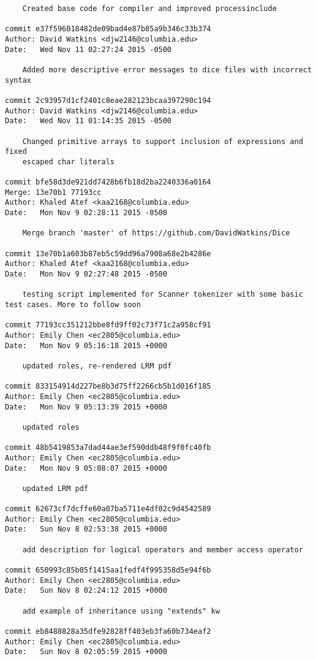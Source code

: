\begin{verbatim}
    Created base code for compiler and improved processinclude

commit e37f596018482de09bad4e87b85a9b346c33b374
Author: David Watkins <djw2146@columbia.edu>
Date:   Wed Nov 11 02:27:24 2015 -0500

    Added more descriptive error messages to dice files with incorrect syntax

commit 2c93957d1cf2401c8eae282123bcaa397290c194
Author: David Watkins <djw2146@columbia.edu>
Date:   Wed Nov 11 01:14:35 2015 -0500

    Changed primitive arrays to support inclusion of expressions and fixed
    escaped char literals

commit bfe58d3de921dd7428b6fb18d2ba2240336a0164
Merge: 13e70b1 77193cc
Author: Khaled Atef <kaa2168@columbia.edu>
Date:   Mon Nov 9 02:28:11 2015 -0500

    Merge branch 'master' of https://github.com/DavidWatkins/Dice

commit 13e70b1a603b87eb5c59dd96a7908a68e2b4286e
Author: Khaled Atef <kaa2168@columbia.edu>
Date:   Mon Nov 9 02:27:48 2015 -0500

    testing script implemented for Scanner tokenizer with some basic test cases. More to follow soon

commit 77193cc351212bbe8fd9ff02c73f71c2a958cf91
Author: Emily Chen <ec2805@columbia.edu>
Date:   Mon Nov 9 05:16:18 2015 +0000

    updated roles, re-rendered LRM pdf

commit 833154914d227be8b3d75ff2266cb5b1d016f185
Author: Emily Chen <ec2805@columbia.edu>
Date:   Mon Nov 9 05:13:39 2015 +0000

    updated roles

commit 48b5419853a7dad44ae3ef590ddb48f9f0fc40fb
Author: Emily Chen <ec2805@columbia.edu>
Date:   Mon Nov 9 05:08:07 2015 +0000

    updated LRM pdf

commit 62673cf7dcffe60a07ba5711e4df02c9d4542589
Author: Emily Chen <ec2805@columbia.edu>
Date:   Sun Nov 8 02:53:38 2015 +0000

    add description for logical operators and member access operator

commit 650993c85b05f1415aa1fedf4f995358d5e94f6b
Author: Emily Chen <ec2805@columbia.edu>
Date:   Sun Nov 8 02:24:12 2015 +0000

    add example of inheritance using "extends" kw

commit eb8488828a35dfe92828ff403eb3fa60b734eaf2
Author: Emily Chen <ec2805@columbia.edu>
Date:   Sun Nov 8 02:05:59 2015 +0000


\end{verbatim}
